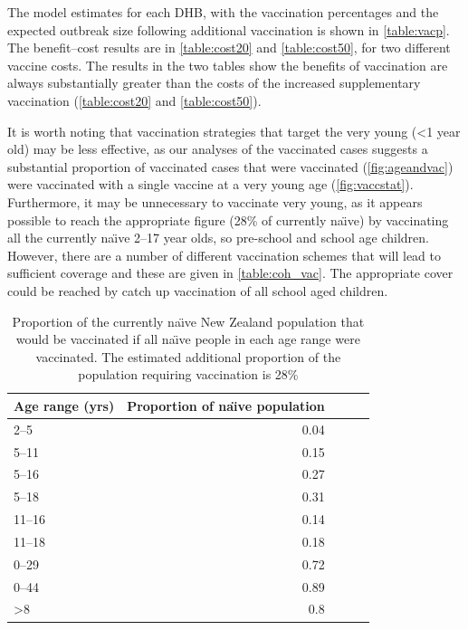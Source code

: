 \documentclass{article}
\begin{document}
The model estimates for each DHB, with the vaccination percentages and the expected outbreak size following additional vaccination is shown in \autoref{table:vacp}. The benefit--cost results are in \autoref{table:cost20} and \autoref{table:cost50}, for two different vaccine costs. The results in the two tables show the benefits of vaccination are always substantially greater than the costs of the increased supplementary vaccination (\autoref{table:cost20} and \autoref{table:cost50}).

It is worth noting that vaccination strategies that target the very young (<1 year old) may be less effective, as our analyses of the vaccinated cases suggests a substantial proportion of vaccinated cases that were vaccinated (\autoref{fig:ageandvac}) were vaccinated with a single vaccine at a very young age (\autoref{fig:vaccstat}). Furthermore, it may be unnecessary to vaccinate very young, as it appears possible to reach the appropriate figure (28\% of currently na\"{\i}ve) by vaccinating all the currently na\"{\i}ve 2--17 year olds, so pre-school and school age children. However, there are a number of different vaccination schemes that will lead to sufficient coverage and these are given in \autoref{table:coh_vac}. The appropriate cover could be reached by catch up vaccination of all school aged children.

\begin{table}[htdp]\small
\begin{center}
\begin{tabular}{lrrrr}
\hline
Age range (yrs) & Proportion of na\"{\i}ve population\\
\hline
2--5 & 0.04\\
5--11 & 0.15\\
5--16 & 0.27\\
5--18 & 0.31\\
11--16 & 0.14\\
11--18 & 0.18\\
0--29 & 0.72\\
0--44 & 0.89\\
>8 & 0.8 \\ 
\hline
\end{tabular}
\end{center}
\caption{Proportion of the currently na\"{\i}ve New Zealand population that would be vaccinated if all na\"{\i}ve people in each age range were vaccinated. The estimated additional proportion of the population requiring vaccination is 28\%}
\label{table:coh_vac}
\end{table}%
\end{document}
